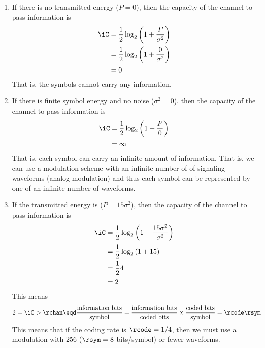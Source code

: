 \begin{example}

\begin{enumerate}
  \item If there is no transmitted energy ($P=0$), then the capacity of
        the channel to pass information is
    \begin{align*}
      \iC
        &= \frac{1}{2}\log_2\left( 1 + \frac{P}{\sigma^2}\right)
      \\&= \frac{1}{2}\log_2\left( 1 + \frac{0}{\sigma^2}\right)
      \\&= 0
    \end{align*}
  That is, the symbols cannot carry any information.

  \item If there is finite symbol energy and no noise ($\sigma^2=0$),
        then the capacity of the channel to pass information is
    \begin{align*}
      \iC
        &= \frac{1}{2}\log_2\left( 1 + \frac{P}{0}\right)
      \\&= \infty
    \end{align*}
  That is, each symbol can carry an infinite amount of information.
  That is, we can use a modulation scheme with an infinite
  number of of signaling waveforms (analog modulation)
  and thus each symbol can be represented by one of an
  infinite number of waveforms.

  \item If the transmitted energy is ($P=15\sigma^2$),
        then the capacity of the channel to pass information is
    \begin{align*}
      \iC
        &= \frac{1}{2}\log_2\left( 1 + \frac{15\sigma^2}{\sigma^2}\right)
      \\&= \frac{1}{2}\log_2\left( 1 + 15\right)
      \\&= \frac{1}{2} 4
      \\&= 2
    \end{align*}
  This means
  \begin{align*}
    2
      &= \iC
       >  \rchan
       \eqd \frac{\mbox{information bits}}{\mbox{symbol}}
       = \frac{\mbox{information bits}}{\mbox{coded bits}} \times
         \frac{\mbox{coded bits}}{\mbox{symbol}}
       = \rcode \rsym
  \end{align*}
  This means that if the coding rate is $\rcode=1/4$,
  then we must use a modulation with $256$ ($\rsym=8$ bits/symbol)
  or fewer waveforms.


\end{enumerate}
\end{example}
